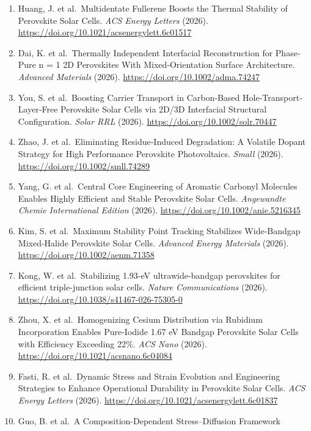 \documentclass[
  11pt,
]{article}
\begin{document}
\begin{enumerate}
  Inverted Perovskite Solar Cells and Modules. \emph{Angewandte Chemie
  International Edition} (2026).
  \url{https://doi.org/10.1002/anie.1678852}
\item
  Huang, J. et al.~Multidentate Fullerene Boosts the Thermal Stability
  of Perovskite Solar Cells. \emph{ACS Energy Letters} (2026).
  \url{https://doi.org/10.1021/acsenergylett.6c01517}
\item
  Dai, K. et al.~Thermally Independent Interfacial Reconstruction for
  Phase‐Pure n = 1 2D Perovskites With Mixed‐Orientation Surface
  Architecture. \emph{Advanced Materials} (2026).
  \url{https://doi.org/10.1002/adma.74247}
\item
  You, S. et al.~Boosting Carrier Transport in Carbon‐Based
  Hole‐Transport‐Layer‐Free Perovskite Solar Cells via 2D/3D Interfacial
  Structural Configuration. \emph{Solar RRL} (2026).
  \url{https://doi.org/10.1002/solr.70447}
\item
  Zhao, J. et al.~Eliminating Residue‐Induced Degradation: A Volatile
  Dopant Strategy for High Performance Perovskite Photovoltaics.
  \emph{Small} (2026). \url{https://doi.org/10.1002/smll.74289}
\item
  Yang, G. et al.~Central Core Engineering of Aromatic Carbonyl
  Molecules Enables Highly Efficient and Stable Perovskite Solar Cells.
  \emph{Angewandte Chemie International Edition} (2026).
  \url{https://doi.org/10.1002/anie.5216345}
\item
  Kim, S. et al.~Maximum Stability Point Tracking Stabilizes
  Wide‐Bandgap Mixed‐Halide Perovskite Solar Cells. \emph{Advanced
  Energy Materials} (2026). \url{https://doi.org/10.1002/aenm.71358}
\item
  Kong, W. et al.~Stabilizing 1.93-eV ultrawide-bandgap perovskites for
  efficient triple-junction solar cells. \emph{Nature Communications}
  (2026). \url{https://doi.org/10.1038/s41467-026-75305-0}
\item
  Zhou, X. et al.~Homogenizing Cesium Distribution via Rubidium
  Incorporation Enables Pure-Iodide 1.67 eV Bandgap Perovskite Solar
  Cells with Efficiency Exceeding 22\%. \emph{ACS Nano} (2026).
  \url{https://doi.org/10.1021/acsnano.6c04084}
\item
  Fasti, R. et al.~Dynamic Stress and Strain Evolution and Engineering
  Strategies to Enhance Operational Durability in Perovskite Solar
  Cells. \emph{ACS Energy Letters} (2026).
  \url{https://doi.org/10.1021/acsenergylett.6c01837}
\item
  Guo, B. et al.~A Composition-Dependent Stress--Diffusion Framework

\end{enumerate}
\end{document}
